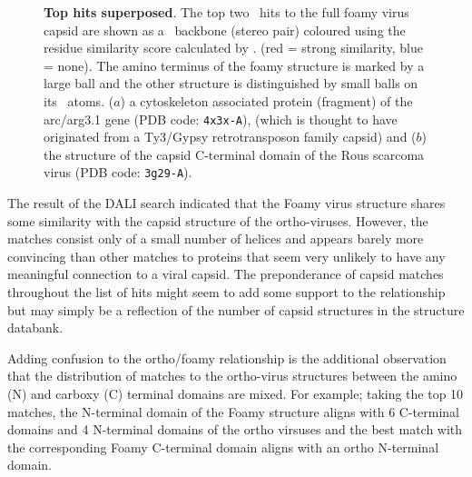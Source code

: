 \begin{figure}
\centering
{}
\begin{footnotesize}
\caption{
\label{Fig:top2}
{\bf Top hits superposed}.
The top two \DALI\ hits to the full foamy virus capsid are shown as a \CA\ backbone (stereo pair) coloured using
the residue similarity score calculated by \SAP. (red = strong similarity, blue = none).
The amino terminus of the foamy structure is marked by a large ball and the other structure is distinguished
by small balls on its \CA\ atoms.
($a$) a cytoskeleton associated protein (fragment) of the arc/arg3.1 gene (PDB code: {\tt 4x3x-A}),
(which is thought to have originated from a Ty3/Gypsy retrotransposon family capsid) 
and 
($b$) the structure of the capsid C-terminal domain of the Rous scarcoma virus (PDB code: {\tt 3g29-A}). 
}
\end{footnotesize}
\end{figure}

The result of the DALI search indicated that the Foamy virus structure shares some similarity with the
capsid structure of the ortho-viruses.  However, the matches consist only of a small number of
helices and appears barely more convincing than other matches to proteins that seem very unlikely
to have any meaningful connection to a viral capsid.   The preponderance of capsid matches
throughout the list of hits might seem to add some support to the relationship but may simply be 
a reflection of the number of capsid structures in the structure databank.

Adding confusion to the ortho/foamy relationship is the additional observation that 
the distribution of matches to the ortho-virus structures between the amino (N) and carboxy
(C) terminal domains are mixed.   For example; taking the top 10 matches, the N-terminal domain of the Foamy
structure aligns with 6 C-terminal domains and 4 N-terminal domains of the ortho virsuses
and the best match with the corresponding Foamy C-terminal domain aligns with an ortho N-terminal domain.

